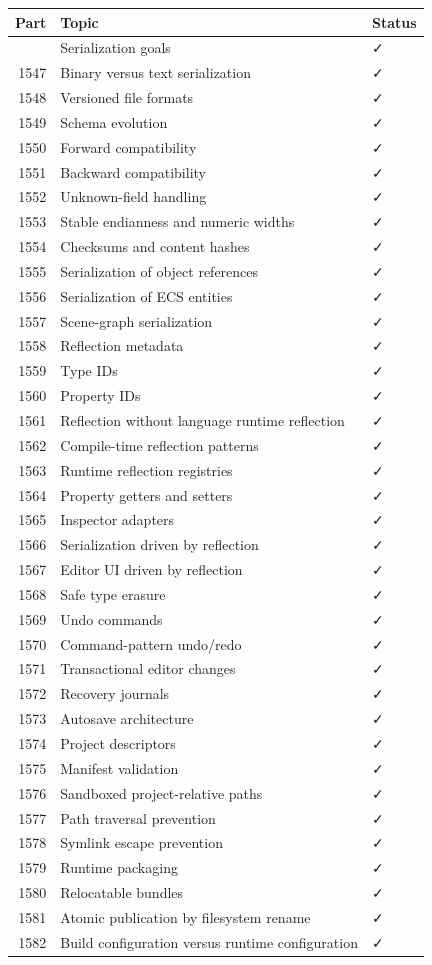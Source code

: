 {\def\LTcaptype{none} %
\begin{longtable}[]{@{}rll@{}}
\toprule\noalign{}
Part & Topic & Status \\
\midrule\noalign{}
\endhead
\bottomrule\noalign{}
\endlastfoot
1546 & Serialization goals & ✓ \\
1547 & Binary versus text serialization & ✓ \\
1548 & Versioned file formats & ✓ \\
1549 & Schema evolution & ✓ \\
1550 & Forward compatibility & ✓ \\
1551 & Backward compatibility & ✓ \\
1552 & Unknown-field handling & ✓ \\
1553 & Stable endianness and numeric widths & ✓ \\
1554 & Checksums and content hashes & ✓ \\
1555 & Serialization of object references & ✓ \\
1556 & Serialization of ECS entities & ✓ \\
1557 & Scene-graph serialization & ✓ \\
1558 & Reflection metadata & ✓ \\
1559 & Type IDs & ✓ \\
1560 & Property IDs & ✓ \\
1561 & Reflection without language runtime reflection & ✓ \\
1562 & Compile-time reflection patterns & ✓ \\
1563 & Runtime reflection registries & ✓ \\
1564 & Property getters and setters & ✓ \\
1565 & Inspector adapters & ✓ \\
1566 & Serialization driven by reflection & ✓ \\
1567 & Editor UI driven by reflection & ✓ \\
1568 & Safe type erasure & ✓ \\
1569 & Undo commands & ✓ \\
1570 & Command-pattern undo/redo & ✓ \\
1571 & Transactional editor changes & ✓ \\
1572 & Recovery journals & ✓ \\
1573 & Autosave architecture & ✓ \\
1574 & Project descriptors & ✓ \\
1575 & Manifest validation & ✓ \\
1576 & Sandboxed project-relative paths & ✓ \\
1577 & Path traversal prevention & ✓ \\
1578 & Symlink escape prevention & ✓ \\
1579 & Runtime packaging & ✓ \\
1580 & Relocatable bundles & ✓ \\
1581 & Atomic publication by filesystem rename & ✓ \\
1582 & Build configuration versus runtime configuration & ✓ \\
\end{longtable}
}

